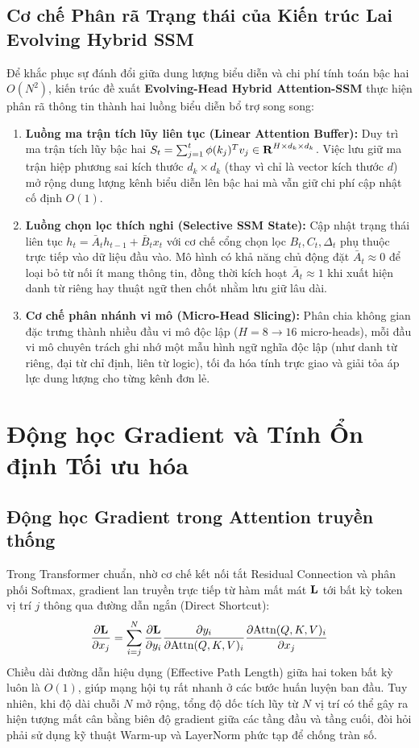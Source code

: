 \documentclass{uetgraduation}
\renewcommand{\mathbb}[1]{\text{\textbf{#1}}}
\renewcommand{\mathcal}[1]{\text{\textbf{#1}}}
\begin{document}
\subsection{Cơ chế Phân rã Trạng thái của Kiến trúc Lai Evolving Hybrid SSM}
Để khắc phục sự đánh đổi giữa dung lượng biểu diễn và chi phí tính toán bậc hai $O(N^2)$, kiến trúc đề xuất \textbf{Evolving-Head Hybrid Attention-SSM} thực hiện phân rã thông tin thành hai luồng biểu diễn bổ trợ song song:
\begin{enumerate}
    \item \textbf{Luồng ma trận tích lũy liên tục (Linear Attention Buffer):} Duy trì ma trận tích lũy bậc hai $S_t = \sum_{j=1}^t \phi(k_j)^T v_j \in \mathbb{R}^{H \times d_k \times d_k}$. Việc lưu giữ ma trận hiệp phương sai kích thước $d_k \times d_k$ (thay vì chỉ là vector kích thước $d$) mở rộng dung lượng kênh biểu diễn lên bậc hai mà vẫn giữ chi phí cập nhật cố định $O(1)$.
    \item \textbf{Luồng chọn lọc thích nghi (Selective SSM State):} Cập nhật trạng thái liên tục $h_t = \bar{A}_t h_{t-1} + \bar{B}_t x_t$ với cơ chế cổng chọn lọc $B_t, C_t, \Delta_t$ phụ thuộc trực tiếp vào dữ liệu đầu vào. Mô hình có khả năng chủ động đặt $\bar{A}_t \approx 0$ để loại bỏ từ nối ít mang thông tin, đồng thời kích hoạt $\bar{A}_t \approx 1$ khi xuất hiện danh từ riêng hay thuật ngữ then chốt nhằm lưu giữ lâu dài.
    \item \textbf{Cơ chế phân nhánh vi mô (Micro-Head Slicing):} Phân chia không gian đặc trưng thành nhiều đầu vi mô độc lập ($H=8 \to 16$ micro-heads), mỗi đầu vi mô chuyên trách ghi nhớ một mẫu hình ngữ nghĩa độc lập (như danh từ riêng, đại từ chỉ định, liên từ logic), tối đa hóa tính trực giao và giải tỏa áp lực dung lượng cho từng kênh đơn lẻ.
\end{enumerate}

\section{Động học Gradient và Tính Ổn định Tối ưu hóa}
\subsection{Động học Gradient trong Attention truyền thống}
Trong Transformer chuẩn, nhờ cơ chế kết nối tắt Residual Connection và phân phối Softmax, gradient lan truyền trực tiếp từ hàm mất mát $\mathcal{L}$ tới bất kỳ token vị trí $j$ thông qua đường dẫn ngắn (Direct Shortcut):
\begin{equation}
\frac{\partial \mathcal{L}}{\partial x_j} = \sum_{i=j}^N \frac{\partial \mathcal{L}}{\partial y_i} \frac{\partial y_i}{\partial \text{Attn}(Q, K, V)_i} \frac{\partial \text{Attn}(Q, K, V)_i}{\partial x_j}
\end{equation}
Chiều dài đường dẫn hiệu dụng (Effective Path Length) giữa hai token bất kỳ luôn là $O(1)$, giúp mạng hội tụ rất nhanh ở các bước huấn luyện ban đầu. Tuy nhiên, khi độ dài chuỗi $N$ mở rộng, tổng độ dốc tích lũy từ $N$ vị trí có thể gây ra hiện tượng mất cân bằng biên độ gradient giữa các tầng đầu và tầng cuối, đòi hỏi phải sử dụng kỹ thuật Warm-up và LayerNorm phức tạp để chống tràn số.
\end{document}
